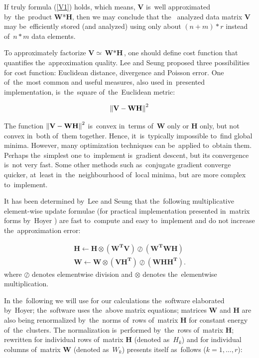 If truly formula (\ref{V1}) holds, which means, {\bf V} is~well
approximated by~the~product {\bf W}*{\bf H}, then we may conclude that the~
analyzed data matrix {\bf V} may be~efficiently stored (and analyzed)
using only about $(n+m)*r$ instead of~$n*m$ data elements.

To approximately factorize $\textbf{V}\simeq{\textbf{W}*\textbf{H}}$, one should define cost function that quantifies the~approximation quality. Lee and Seung proposed three possibilities for cost function: Euclidean distance, divergence and Poisson error. One of~the~most common and useful measures, also used in~presented implementation, is~the~square of~the~Euclidean metric:

\begin{equation}
\left\lVert\textbf{V}-\textbf{WH}\right\rVert^2
\end{equation}

The function $\left\lVert\textbf{V}-\textbf{WH}\right\rVert^2$ is~convex in~terms of~\textbf{W} only or \textbf{H} only, but not convex in~both of~them together. Hence, it~is~typically impossible to~find global minima. However, many optimization techniques can be~applied to~obtain them. Perhaps the~simplest one to~implement is~gradient descent, but its convergence is~not very fast. Some other methods such as~conjugate gradient converge quicker, at~least in~the~neighbourhood of~local minima, but are more complex to~implement.

It has been determined by~Lee and Seung that the~following multiplicative element-wise update formulae (for practical implementation presented in~matrix forms by~Hoyer \cite{hoyer2004non}) are fast to~compute and easy to~implement and do not increase the~approximation error:

\begin{equation}
\begin{array}{ll}
   &\mathbf{H} \leftarrow \mathbf{H}\otimes(\mathbf{W^TV})\oslash
(\mathbf{W^TWH}) \quad \\
   & \mathbf{W} \leftarrow \mathbf{W}\otimes(\mathbf{VH^T})\oslash(\mathbf{WHH^T}).
\end{array}
\end{equation}
where $\oslash$ denotes elementwise division and $\otimes$ denotes the~elementwise multiplication. 

In the~following we will use for our calculations the~software elaborated by~Hoyer; the~software uses the~above matrix equations; matrices \textbf{W} and \textbf{H} are also being renormalized by~the~norms of~rows of~matrix \textbf{H} for constant energy of~the~clusters. 
The normalization is~performed by~the~rows of~matrix \textbf{H}; rewritten for individual rows of~matrix \textbf{H} (denoted as~${H_{k}}$) and for individual columns of~matrix \textbf{W} (denoted as~${W_{k}}$) presents itself as~follows ($k=1, \dots, r$):

